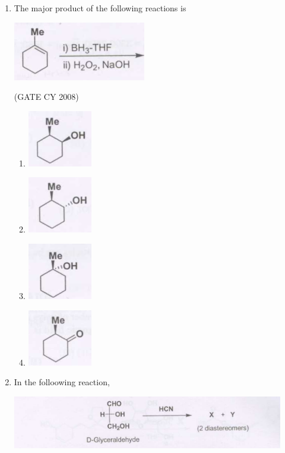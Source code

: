 \documentclass[12pt]{article}
\begin{document}
\begin{enumerate}
\item The major product of the following reactions is

\begin{center}
\includegraphics[width=0.6\columnwidth]{figs/q51.png}
\end{center}    \hfill{(GATE CY 2008)}
\begin{enumerate}
    \item \includegraphics[width=0.2\columnwidth]{figs/q51 a.png}
    \item \includegraphics[width=0.2\columnwidth]{figs/q51 b.png}
    \item \includegraphics[width=0.2\columnwidth]{figs/q51 c.png}
    \item \includegraphics[width=0.2\columnwidth]{figs/q51 d.png}
\end{enumerate}

\item In the folloowing reaction,

\begin{center}
\includegraphics[width=0.6\columnwidth]{figs/q52.png}
\end{center}


\end{enumerate}
\end{document}
